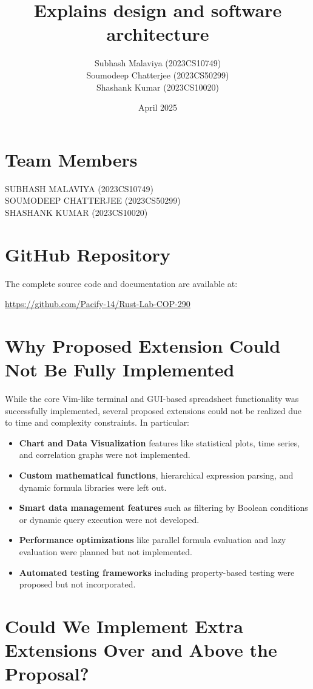 \documentclass{article}
\title{Explains design and software architecture}
\author{
  Subhash Malaviya (2023CS10749) \\
  Soumodeep Chatterjee (2023CS50299) \\ 
  Shashank Kumar (2023CS10020)
}
\date{April 2025}
\begin{document}
\maketitle

\section*{Team Members}

\noindent
\parbox{\textwidth}{
  SUBHASH MALAVIYA (2023CS10749)\\
  SOUMODEEP CHATTERJEE (2023CS50299)\\
  SHASHANK KUMAR (2023CS10020)
}

\section*{GitHub Repository}

The complete source code and documentation are available at: 

\noindent
\url{https://github.com/Pacify-14/Rust-Lab-COP-290}

\section{Why Proposed Extension Could Not Be Fully Implemented}

While the core Vim-like terminal and GUI-based spreadsheet functionality was successfully implemented, several proposed extensions could not be realized due to time and complexity constraints. In particular:
\begin{itemize}
  \item \textbf{Chart and Data Visualization} features like statistical plots, time series, and correlation graphs were not implemented.
  \item \textbf{Custom mathematical functions}, hierarchical expression parsing, and dynamic formula libraries were left out.
  \item \textbf{Smart data management features} such as filtering by Boolean conditions or dynamic query execution were not developed.
  \item \textbf{Performance optimizations} like parallel formula evaluation and lazy evaluation were planned but not implemented.
  \item \textbf{Automated testing frameworks} including property-based testing were proposed but not incorporated.
\end{itemize}

\section{Could We Implement Extra Extensions Over and Above the Proposal?}
\end{document}
